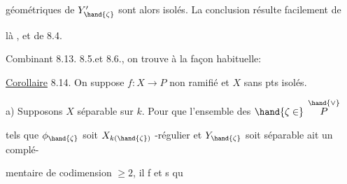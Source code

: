 géométriques de $Y'_{\hand{\zeta}}$ sont alors isolés. La conclusion résulte facilement de

là , et de 8.4. 

Combinant 8.13.  8.5.et 8.6.\hand{/}, on trouve à la façon habituelle:

\uline{Corollaire} 8.14. On suppose $f:X\rightarrow P$ non ramifié et $X$ sans pts isolés.

 a) Supposons $X$ séparable sur $k$. Pour que l'ensemble  des $\hand{\zeta \in}$ $\overset{\hand{\vee}}{P}$

tels que $\phi_{\hand{\zeta}}$ soit $X_{k(\hand{\zeta})}$ -régulier et $Y_{\hand{\zeta}}$ soit séparable ait un complé-%

mentaire de codimension $\geq 2$, il f et s qu

